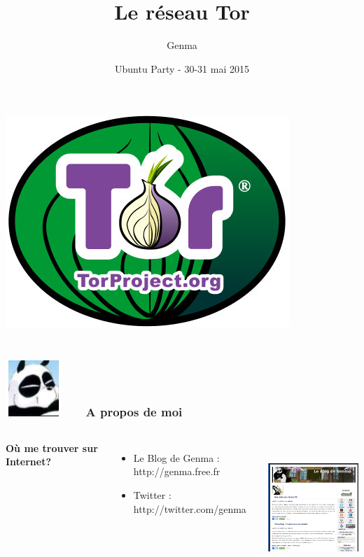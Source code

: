 \documentclass{beamer}
\title[Tor et le Tor Browser Bundle]{Le réseau Tor}
\author{Genma}
\date{Ubuntu Party - 30-31 mai 2015}
\begin{document}
\begin{frame}
	\titlepage
	\begin{center}
		\includegraphics[scale=0.2]{./images/logo_tor.jpg}
		\\		
		\\[2.5ex]
		{\tiny\CcNote{\CcLongnameByNcSa}}
		\vspace*{-2.5ex}
	\end{center}
\end{frame}

\begin{frame}
\frametitle{\includegraphics[scale=0.4]{./images/Genma.jpg} \ \ \  A propos de moi  }
\begin{columns}[c] 

\textbf{Où me trouver sur Internet?}
\begin{itemize}
\item Le Blog de Genma : http://genma.free.fr
\item Twitter : http://twitter.com/genma
\end{itemize}
\includegraphics[width=5cm,height=5cm]{./images/blog.png} 
\end{columns}
\end{frame}
\end{document}
